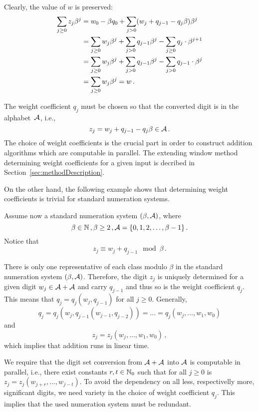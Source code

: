      Clearly, the value of $w$ is preserved:
\begin{align}
\label{eq:valuePreserving}
    \sum_{j\geq 0} z_j \beta^j &=w_0 - \beta q_0 + \sum_{j> 0} (w_j + q_{j-1} - q_j \beta) \beta^j \notag\\
    &=\sum_{j\geq 0} w_j \beta^j + \sum_{j>0} q_{j-1} \beta^j - \sum_{j\geq 0} q_j \cdot \beta^{j+1}  \\
    &=\sum_{j\geq 0} w_j \beta^j + \sum_{j>0} q_{j-1} \beta^j - \sum_{j> 0} q_{j-1} \cdot \beta^j \notag\\
    &=\sum_{j\geq 0} w_j \beta^j = w\,. \notag
\end{align}

     The weight coefficient $q_j$ must be chosen so that the converted digit is in the alphabet~$\mathcal{A}$, i.e., 
    \begin{equation}
    \label{eq:conversionFormula}
        z_j=w_j + q_{j-1} - q_j \beta \in \mathcal{A}\,.
    \end{equation} 
    The choice of weight coefficients is the crucial part in order to construct addition algorithms which are computable in parallel. The extending window method determining weight coefficients for a given input is decribed in Section~\ref{sec:methodDescription}.
    
    
     On the other hand, the following example shows that determining weight coefficients is trivial for standard numeration systems.
     
     \begin{exmp}
        Assume now a standard numeration system $(\beta, \mathcal{A})$, where
  $$
    \beta \in \mathbb{N}\,,\beta  \geq 2\,, \mathcal{A} = \{0, 1, 2,\dots, \beta -1 \}\,.
  $$ 
       Notice that
    $$
        z_j \equiv w_j+q_{j-1} \mod \beta\,. 
    $$
  
  There is only one representative of each class modulo  $\beta$ in the standard numeration system $(\beta, \mathcal{A})$. Therefore, the digit $z_j$ is uniquely determined for a given digit $w_j \in \mathcal{A}+\mathcal{A}$ and carry $q_{j-1}$ and thus so is the weight coefficient $q_j$. This means that $q_j=q_j(w_j,q_{j-1})$ for all $j\geq 0$. Generally,
  $$
  q_j=q_j(w_j,q_{j-1}(w_{j-1},q_{j-2}))=\dots =q_j(w_j ,\dots , w_1, w_0)
  $$
  and
  $$
  z_j=z_j(w_j ,\dots , w_1, w_0)\,,
  $$
  which implies that addition runs in linear time.
     
     \end{exmp}
  
  We require that the digit set conversion from $\mathcal{A}+\mathcal{A}$ into $\mathcal{A}$ is computable in parallel, i.e., there exist constants $r,t \in \mathbb{N}_0$ such that for all $j\geq 0$ is $z_j=z_j(w_{j+r},\dots,w_{j-t})$. To avoid the dependency on all less, respectivelly more, significant digits, we need variety in the choice of weight coefficient $q_j$. This implies that the used numeration system must be redundant.
  

